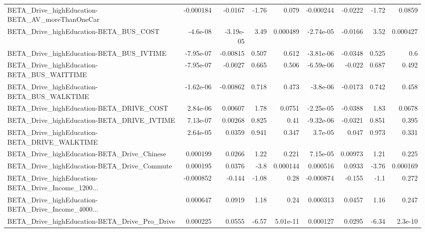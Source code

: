 \begin{tabular}{lrrrrrrrr}
BETA\_Drive\_highEducation-BETA\_AV\_moreThanOneCar    &   -0.000184 &      -0.0167 &     -1.76 &    0.079 &  -0.000244 &     -0.0222 &        -1.72 &        0.0859 \\
BETA\_Drive\_highEducation-BETA\_BUS\_COST             &    -4.6e-08 &    -3.19e-05 &      3.49 & 0.000489 &  -2.74e-05 &     -0.0166 &         3.52 &      0.000427 \\
BETA\_Drive\_highEducation-BETA\_BUS\_IVTIME           &   -7.95e-07 &     -0.00815 &     0.507 &    0.612 &  -3.81e-06 &     -0.0348 &        0.525 &           0.6 \\
BETA\_Drive\_highEducation-BETA\_BUS\_WAITTIME         &   -7.95e-07 &      -0.0027 &     0.665 &    0.506 &  -6.59e-06 &      -0.022 &        0.687 &         0.492 \\
BETA\_Drive\_highEducation-BETA\_BUS\_WALKTIME         &   -1.62e-06 &     -0.00862 &     0.718 &    0.473 &   -3.8e-06 &     -0.0173 &        0.742 &         0.458 \\
BETA\_Drive\_highEducation-BETA\_DRIVE\_COST           &    2.84e-06 &      0.00607 &      1.78 &   0.0751 &  -2.25e-05 &     -0.0388 &         1.83 &        0.0678 \\
BETA\_Drive\_highEducation-BETA\_DRIVE\_IVTIME         &    7.13e-07 &      0.00268 &     0.825 &     0.41 &  -9.32e-06 &     -0.0321 &        0.851 &         0.395 \\
BETA\_Drive\_highEducation-BETA\_DRIVE\_WALKTIME       &    2.64e-05 &       0.0359 &     0.941 &    0.347 &    3.7e-05 &       0.047 &        0.973 &         0.331 \\
BETA\_Drive\_highEducation-BETA\_Drive\_Chinese        &    0.000199 &       0.0266 &      1.22 &    0.221 &   7.15e-05 &     0.00973 &         1.21 &         0.225 \\
BETA\_Drive\_highEducation-BETA\_Drive\_Commute        &    0.000195 &       0.0376 &      -3.8 & 0.000144 &   0.000516 &      0.0933 &        -3.76 &      0.000169 \\
BETA\_Drive\_highEducation-BETA\_Drive\_Income\_1200... &   -0.000852 &       -0.144 &     -1.08 &     0.28 &  -0.000874 &      -0.155 &         -1.1 &         0.272 \\
BETA\_Drive\_highEducation-BETA\_Drive\_Income\_4000... &    0.000647 &       0.0919 &      1.18 &     0.24 &   0.000313 &      0.0457 &         1.16 &         0.247 \\
BETA\_Drive\_highEducation-BETA\_Drive\_Pro\_Drive      &    0.000225 &       0.0555 &     -6.57 & 5.01e-11 &   0.000127 &      0.0295 &        -6.34 &       2.3e-10 \\

\end{tabular}
